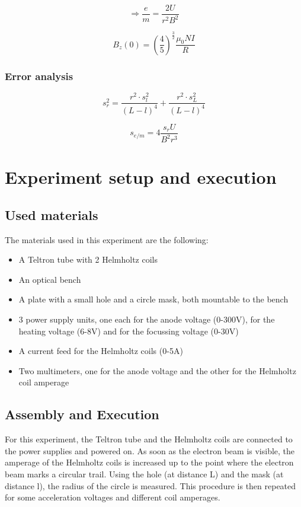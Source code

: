 \documentclass{scrreprt}
\begin{document}
\begin{equation}
\Longrightarrow \frac{e}{m} = \frac{2 U}{r^2 B^2}
\end{equation}

\begin{equation}
B_z (0) = \left( \frac{4}{5}\right)^{\frac{3}{2}} \frac{\mu_0 N I}{R}
\end{equation}

\subsubsection{Error analysis}

\begin{equation}
s_r^2 = \frac{r^2\cdot s_l^2}{(L-l)^4} + \frac{r^2\cdot s_L^2}{(L-l)^4}
\end{equation}

\begin{equation}
s_{e/m} = 4 \frac{s_r U}{B^2 r^3}
\end{equation}

\section{Experiment setup and execution}

\subsection{Used materials}
The materials used in this experiment are the following:
\begin{itemize}
\item A Teltron tube with 2 Helmholtz coils
\item An optical bench
\item A plate with a small hole and a circle mask, both mountable to the bench
\item 3 power supply units, one each for the anode voltage (0-300V), for the heating voltage (6-8V) and for the focussing voltage (0-30V)
\item A current feed for the Helmholtz coils (0-5A)
\item Two multimeters, one for the anode voltage and the other for the Helmholtz coil amperage
\end{itemize}

\subsection{Assembly and Execution}
For this experiment, the Teltron tube and the Helmholtz coils are connected to the power supplies and powered on. As soon as the electron beam is visible, the amperage of the Helmholtz coils is increased up to the point where the electron beam marks a circular trail. Using the hole (at distance L) and the mask (at distance l), the radius of the circle is measured. This procedure is then repeated for some acceleration voltages and different coil amperages.
\end{document}
